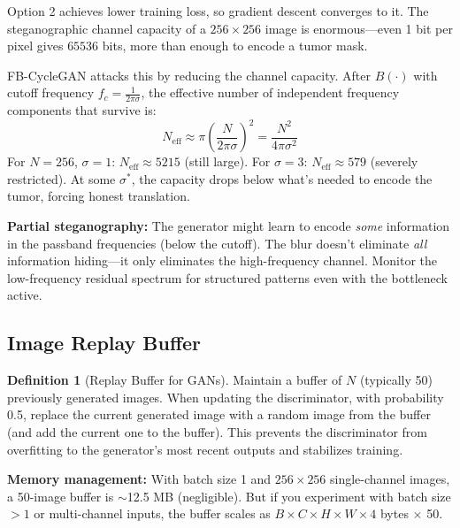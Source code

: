 \documentclass[11pt,a4paper]{article}
\theoremstyle{definition}
\newtheorem{definition}{Definition}[section]
\begin{document}
Option 2 achieves lower training loss, so gradient descent converges to it. The steganographic channel capacity of a $256 \times 256$ image is enormous---even 1 bit per pixel gives $65536$ bits, more than enough to encode a tumor mask.

\begin{keyinsight}
FB-CycleGAN attacks this by reducing the channel capacity. After $B(\cdot)$ with cutoff frequency $f_c = \frac{1}{2\pi\sigma}$, the effective number of independent frequency components that survive is:
\[
    N_{\text{eff}} \approx \pi \left(\frac{N}{2\pi\sigma}\right)^2 = \frac{N^2}{4\pi\sigma^2}
\]
For $N=256$, $\sigma=1$: $N_{\text{eff}} \approx 5215$ (still large). For $\sigma=3$: $N_{\text{eff}} \approx 579$ (severely restricted). At some $\sigma^*$, the capacity drops below what's needed to encode the tumor, forcing honest translation.
\end{keyinsight}

\begin{edgecase}
\textbf{Partial steganography:} The generator might learn to encode \textit{some} information in the passband frequencies (below the cutoff). The blur doesn't eliminate \textit{all} information hiding---it only eliminates the high-frequency channel. Monitor the low-frequency residual spectrum for structured patterns even with the bottleneck active.
\end{edgecase}

\subsection{Image Replay Buffer}

\begin{definition}[Replay Buffer for GANs]
Maintain a buffer of $N$ (typically 50) previously generated images. When updating the discriminator, with probability 0.5, replace the current generated image with a random image from the buffer (and add the current one to the buffer). This prevents the discriminator from overfitting to the generator's most recent outputs and stabilizes training.
\end{definition}

\begin{edgecase}
\textbf{Memory management:} With batch size 1 and $256 \times 256$ single-channel images, a 50-image buffer is $\sim$12.5 MB (negligible). But if you experiment with batch size $>1$ or multi-channel inputs, the buffer scales as $B \times C \times H \times W \times 4$ bytes $\times$ 50.
\end{edgecase}
\end{document}
